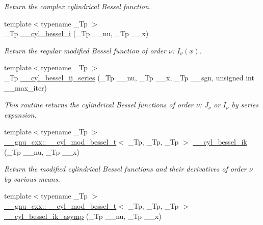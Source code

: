 \begin{DoxyCompactItemize}
\begin{DoxyCompactList}\small\item\em Return the complex cylindrical Bessel function. \end{DoxyCompactList}\item 
{\footnotesize template$<$typename \+\_\+\+Tp $>$ }\\\+\_\+\+Tp \hyperlink{namespacestd_1_1____detail_a72e3392d5c03c0bc8f2b5ffb8c1304b5}{\+\_\+\+\_\+cyl\+\_\+bessel\+\_\+i} (\+\_\+\+Tp \+\_\+\+\_\+nu, \+\_\+\+Tp \+\_\+\+\_\+x)
\begin{DoxyCompactList}\small\item\em Return the regular modified Bessel function of order $ \nu $\+: $ I_{\nu}(x) $. \end{DoxyCompactList}\item 
{\footnotesize template$<$typename \+\_\+\+Tp $>$ }\\\+\_\+\+Tp \hyperlink{namespacestd_1_1____detail_a8b52f1f93a90b9ed2504521e0ea440f5}{\+\_\+\+\_\+cyl\+\_\+bessel\+\_\+ij\+\_\+series} (\+\_\+\+Tp \+\_\+\+\_\+nu, \+\_\+\+Tp \+\_\+\+\_\+x, \+\_\+\+Tp \+\_\+\+\_\+sgn, unsigned int \+\_\+\+\_\+max\+\_\+iter)
\begin{DoxyCompactList}\small\item\em This routine returns the cylindrical Bessel functions of order $ \nu $\+: $ J_{\nu} $ or $ I_{\nu} $ by series expansion. \end{DoxyCompactList}\item 
{\footnotesize template$<$typename \+\_\+\+Tp $>$ }\\\hyperlink{struct____gnu__cxx_1_1____cyl__mod__bessel__t}{\+\_\+\+\_\+gnu\+\_\+cxx\+::\+\_\+\+\_\+cyl\+\_\+mod\+\_\+bessel\+\_\+t}$<$ \+\_\+\+Tp, \+\_\+\+Tp, \+\_\+\+Tp $>$ \hyperlink{namespacestd_1_1____detail_a9ada6640e605fc21b12191e651e39de1}{\+\_\+\+\_\+cyl\+\_\+bessel\+\_\+ik} (\+\_\+\+Tp \+\_\+\+\_\+nu, \+\_\+\+Tp \+\_\+\+\_\+x)
\begin{DoxyCompactList}\small\item\em Return the modified cylindrical Bessel functions and their derivatives of order $ \nu $ by various means. \end{DoxyCompactList}\item 
{\footnotesize template$<$typename \+\_\+\+Tp $>$ }\\\hyperlink{struct____gnu__cxx_1_1____cyl__mod__bessel__t}{\+\_\+\+\_\+gnu\+\_\+cxx\+::\+\_\+\+\_\+cyl\+\_\+mod\+\_\+bessel\+\_\+t}$<$ \+\_\+\+Tp, \+\_\+\+Tp, \+\_\+\+Tp $>$ \hyperlink{namespacestd_1_1____detail_a9f88b1d2b4158cc854a91a5ae7b4168d}{\+\_\+\+\_\+cyl\+\_\+bessel\+\_\+ik\+\_\+asymp} (\+\_\+\+Tp \+\_\+\+\_\+nu, \+\_\+\+Tp \+\_\+\+\_\+x)

\end{DoxyCompactItemize}
